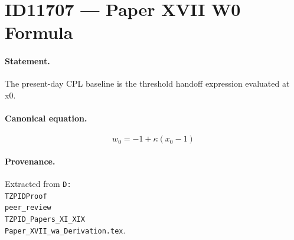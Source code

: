 \section*{ID11707 --- Paper XVII W0 Formula}

\paragraph{Statement.}
The present-day CPL baseline is the threshold handoff expression evaluated at x0.

\paragraph{Canonical equation.}
\[
w_0=-1+\kappa(x_0-1)
\]

\paragraph{Provenance.}
Extracted from \texttt{D:\\TZPIDProof\\peer\_review\\TZPID\_Papers\_XI\_XIX\\Paper\_XVII\_wa\_Derivation.tex}.
